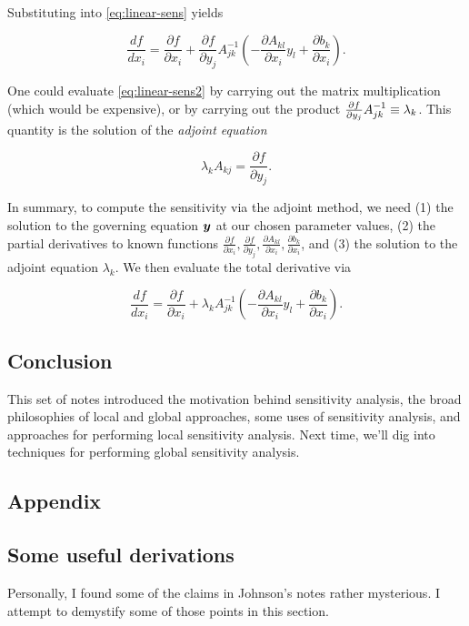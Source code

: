 \documentclass[../primer.tex]{subfiles}
\begin{document}
\noindent Substituting into \eqref{eq:linear-sens} yields

\begin{equation}\label{eq:linear-sens2}
\frac{df}{dx_i} = \frac{\partial f}{\partial x_i} + \frac{\partial f}{\partial y_j}A^{-1}_{jk}%
\left(-\frac{\partial A_{kl}}{\partial x_i}y_l + \frac{\partial b_k}{\partial x_i}\right).
\end{equation}

One could evaluate \eqref{eq:linear-sens2} by carrying out the matrix
multiplication (which would be expensive), or by carrying out the product
\(\frac{\partial f}{\partial y_j}A^{-1}_{jk}\equiv\nobreak\lambda_k\). This
quantity is the solution of the \emph{adjoint equation}

\begin{equation}\label{eq:linear-adjoint}
\lambda_k A_{kj} = \frac{\partial f}{\partial y_j}.
\end{equation}

In summary, to compute the sensitivity via the adjoint method, we need (1) the
solution to the governing equation \(\boldsymbol{y}\) at our chosen parameter values, (2) the
partial derivatives to known functions \(\frac{\partial f}{\partial x_i},
\frac{\partial f}{\partial y_j}, \frac{\partial A_{kl}}{\partial x_i},
\frac{\partial b_k}{\partial x_i}\), and (3) the solution to the adjoint equation
\(\lambda_k\). We then evaluate the total derivative via

\begin{equation}
\frac{df}{dx_i} = \frac{\partial f}{\partial x_i} + \lambda_k A^{-1}_{jk}\left(-\frac{\partial A_{kl}}{\partial x_i}y_l + \frac{\partial b_k}{\partial x_i}\right).
\end{equation}

\subsection{Conclusion}
\label{sec:org9f00d47}
This set of notes introduced the motivation behind sensitivity analysis, the
broad philosophies of local and global approaches, some uses of sensitivity
analysis, and approaches for performing local sensitivity analysis. Next time,
we'll dig into techniques for performing global sensitivity analysis.

\subsection{Appendix}
\label{sec:org880d431}
\subsection{Some useful derivations}
\label{sec:org1df2b75}
Personally, I found some of the claims in Johnson's notes rather
mysterious.\cite{johnson2012} I attempt to demystify some of those points in this
section.
\end{document}
